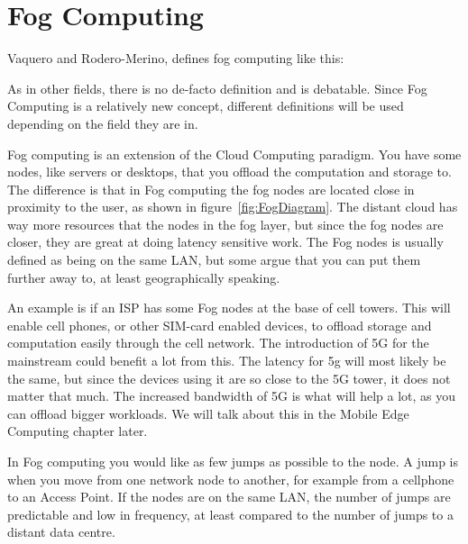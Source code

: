 




\section{Fog Computing}

Vaquero and Rodero-Merino\cite{vaquero_finding_2014}, defines fog computing like this: 

As in other fields, there is no de-facto definition and is debatable. Since Fog Computing is a relatively new concept, different definitions will be used depending on the field they are in.

Fog computing is an extension of the Cloud Computing paradigm. You have some nodes, like servers or desktops, that you offload the computation and storage to. The difference is that in Fog computing the fog nodes are located close in proximity to the user\cite{msftadmin_concept_2020}, as shown in figure~\ref{fig:FogDiagram}. The distant cloud has way more resources that the nodes in the fog layer, but since the fog nodes are closer, they are great at doing latency sensitive work. The Fog nodes is usually defined as being on the same LAN, but some argue that you can put them further away to, at least geographically speaking. 

An example is if an ISP has some Fog nodes at the base of cell towers. This will enable cell phones, or other SIM-card enabled devices, to offload storage and computation easily through the cell network. The introduction of 5G for the mainstream could benefit a lot from this. The latency for 5g will most likely be the same, but since the devices using it are so close to the 5G tower, it does not matter that much. The increased bandwidth of 5G is what will help a lot, as you can offload bigger workloads. We will talk about this in the Mobile Edge Computing chapter later. 

In Fog computing you would like as few jumps as possible to the node. A jump is when you move from one network node to another, for example from a cellphone to an Access Point. If the nodes are on the same LAN, the number of jumps are predictable and low in frequency, at least compared to the number of jumps to a distant data centre. 


